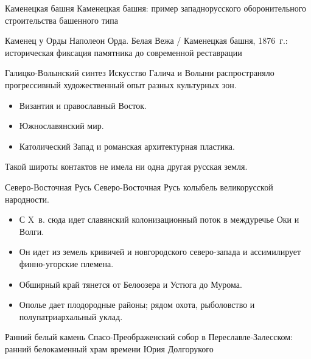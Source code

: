 \begin{frame}{Каменецкая башня}
    {Каменецкая башня: пример западнорусского оборонительного
     строительства башенного типа}
\end{frame}

\begin{frame}{Каменец у Орды}
    {Наполеон Орда. Белая Вежа / Каменецкая башня, 1876~г.:
     историческая фиксация памятника до современной реставрации}
\end{frame}

\begin{frame}{Галицко-Волынский синтез}
  Искусство Галича и Волыни распространяло прогрессивный художественный
  опыт разных культурных зон.
  \begin{itemize}
    \item Византия и православный Восток.
    \item Южнославянский мир.
    \item Католический Запад и романская архитектурная пластика.
  \end{itemize}
  Такой широты контактов не имела ни одна другая русская земля.
\end{frame}

\begin{frame}{Северо-Восточная Русь}
  Северо-Восточная Русь колыбель великорусской народности.
  \begin{itemize}
    \item С X~в. сюда идет славянский колонизационный поток
          в междуречье Оки и Волги.
    \item Он идет из земель кривичей и новгородского северо-запада
          и ассимилирует финно-угорские племена.
    \item Обширный край тянется от Белоозера и Устюга
          до Мурома.
    \item Ополье дает плодородные районы; рядом охота,
          рыболовство и полупатриархальный уклад.
  \end{itemize}
\end{frame}

\begin{frame}{Ранний белый камень}
    {Спасо-Преображенский собор в Переславле-Залесском:
     ранний белокаменный храм времени Юрия Долгорукого}
\end{frame}

